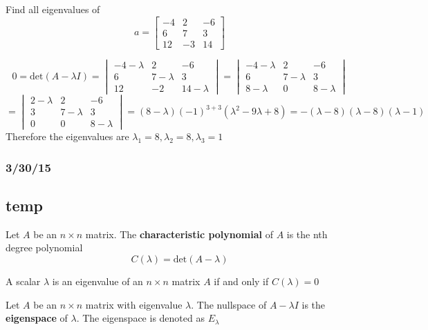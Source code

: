 \documentclass[english, 12pt]{article}
\begin{document}
\begin{exmp}
Find all eigenvalues of
\[a = \begin{bmatrix} -4 & 2 & -6 \\ 6 & 7 & 3 \\ 12 & -3 & 14 \end{bmatrix}\]
\begin{sol}
\[0 = \text{det}(A - \lambda I) = \begin{vmatrix}-4 - \lambda & 2 & - 6 \\ 6 & 7 - \lambda & 3 \\ 12 & -2 & 14 - \lambda \end{vmatrix} = \begin{vmatrix} -4 - \lambda & 2 & -6 \\ 6 & 7 - \lambda & 3 \\ 8 - \lambda & 0 & 8 - \lambda \end{vmatrix}\]
\[ = \begin{vmatrix} 2 - \lambda & 2 & -6 \\ 3 & 7 - \lambda & 3 \\ 0 & 0 & 8 - \lambda \end{vmatrix} =(8-\lambda)(-1)^{3+3} (\lambda^2 - 9 \lambda + 8) = -(\lambda - 8)(\lambda - 8)(\lambda - 1)\]
Therefore the eigenvalues are $\lambda_1 = 8, \lambda_2 = 8, \lambda_3 = 1$
\end{sol}
\end{exmp}

\subsubsection*{3/30/15}
\subsection{temp}

\begin{defn}
Let $A$ be an $n \times n$ matrix. The \textbf{characteristic polynomial} of $A$ is the nth degree polynomial
\[C(\lambda) = \text{det}(A - \lambda)\]
\end{defn}

\begin{thrm}
A scalar $\lambda$ is an eigenvalue of an $n \times n$ matrix $A$ if and only if $C(\lambda) = 0$
\end{thrm}

\begin{defn}
Let $A$ be an $n \times n$ matrix with eigenvalue $\lambda$. The nullspace of $A - \lambda I$ is the \textbf{eigenspace} of $\lambda$. The eigenspace is denoted as $E_\lambda$
\end{defn}
\end{document}
